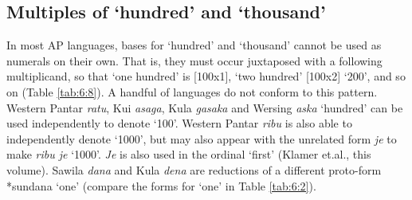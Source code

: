 \documentclass[output=paper]{LSP/langsci}
\begin{document}
        







\subsection{Multiples of `hundred' and `thousand'} \label{sec:6:6.3}
In most AP languages, bases for `hundred' and `thousand' cannot be used as numerals on their own. That is, they must occur juxtaposed with a following multiplicand, so that `one hundred' is [100x1], `two hundred' [100x2] `200', and so on (Table \ref{tab:6:8}). A handful of languages do not conform to this pattern. Western Pantar \textit{ratu}, Kui \textit{asaga}, Kula \textit{gasaka} and Wersing \textit{aska} `hundred' can be used independently to denote `100'. Western Pantar \textit{ribu} is also able to independently denote `1000', but may also appear with the unrelated form \textit{je} to make \textit{ribu je} `1000'. \textit{Je} is also used in the ordinal `first' (Klamer et.al., this volume). Sawila \textit{dana} and Kula \textit{dena} are reductions of a different proto-form *sundana `one' (compare the forms for `one' in Table \ref{tab:6:2}).


 
\end{document}
